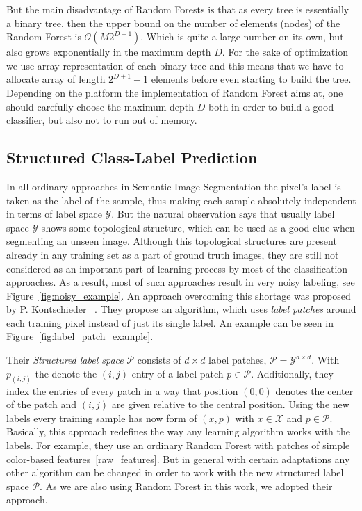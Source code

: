 But the main disadvantage of Random Forests is that as every tree is essentially a binary tree,
then the upper bound on the number of elements (nodes) of the Random Forest is $\mathcal{O}(M 2^{D+1})$. Which is
quite a large number on its own, but also grows exponentially in the maximum depth $D$. For the sake of optimization
we use array representation of each binary tree and this means that we have to allocate array of length $2^{D+1} - 1$ elements
before even starting to build the tree. Depending on the platform the implementation of Random Forest aims at, one should carefully
choose the maximum depth $D$ both in order to build a good classifier, but also not to run out of memory.


\subsection{Structured Class-Label Prediction}
\label{scl_description}
In all ordinary approaches in Semantic Image Segmentation the pixel's label is taken as the label of the sample, thus making
each sample absolutely independent in terms of label space $\mathcal{Y}$. But the natural observation says that usually
label space $\mathcal{Y}$ shows some topological structure, which can be used as a good clue when segmenting an unseen image.
Although this topological structures are present already in any training set as a part of ground truth images, they are still
not considered as an important part of learning process by most of the classification approaches. As a result, most of such
approaches result in very noisy labeling, \eg see Figure~\ref{fig:noisy_example}. An approach overcoming this shortage was proposed
by P. Kontschieder \etal~\cite{Kontschieder2011}. They propose an algorithm, which uses \emph{label patches} around each training
pixel instead of just its single label. An example can be seen in Figure~\ref{fig:label_patch_example}.

Their \emph{Structured label space} $\mathcal{P}$ consists of $ d \times d $ label patches, \ie 
$ \mathcal{P} = \mathcal{Y}^{d \times d}$. With $p_{(i,j)}$ the denote the $(i, j)$-entry of a label patch $p \in \mathcal{P}$.
Additionally, they index the entries of every patch in a way that position $(0, 0)$ denotes the center of the patch and $(i, j)$
are given relative to the central position. Using the new labels every training sample has now form of $(x, p)$ with 
$x \in \mathcal{X}$ and $p \in \mathcal{P}$. Basically, this approach redefines the way any learning algorithm works
with the labels. For example, they use an ordinary Random Forest with patches of simple color-based features~\ref{raw_features}.
But in general with certain adaptations any other algorithm can be changed in order to work with the new structured
label space $\mathcal{P}$. As we are also using Random Forest in this work, we adopted their approach.

